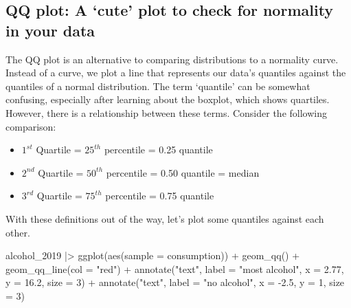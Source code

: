 \documentclass[
  letterpaper,
  DIV=11,
  numbers=noendperiod]{scrreprt}
\newenvironment{Shaded}{\begin{snugshade}}{\end{snugshade}}
\newcommand{\AttributeTok}[1]{\textcolor[rgb]{0.40,0.45,0.13}{#1}}
\newcommand{\DecValTok}[1]{\textcolor[rgb]{0.68,0.00,0.00}{#1}}
\newcommand{\FloatTok}[1]{\textcolor[rgb]{0.68,0.00,0.00}{#1}}
\newcommand{\FunctionTok}[1]{\textcolor[rgb]{0.28,0.35,0.67}{#1}}
\newcommand{\NormalTok}[1]{\textcolor[rgb]{0.00,0.23,0.31}{#1}}
\newcommand{\SpecialCharTok}[1]{\textcolor[rgb]{0.37,0.37,0.37}{#1}}
\newcommand{\StringTok}[1]{\textcolor[rgb]{0.13,0.47,0.30}{#1}}
\begin{document}
\subsection{QQ plot: A `cute' plot to check for normality in your
data}\label{sec-qq-plot}

The QQ plot is an alternative to comparing distributions to a normality
curve. Instead of a curve, we plot a line that represents our data's
quantiles against the quantiles of a normal distribution. The term
`quantile' can be somewhat confusing, especially after learning about
the boxplot, which shows quartiles. However, there is a relationship
between these terms. Consider the following comparison:

\begin{itemize}
\item
  \(1^{st}\) Quartile = \(25^{th}\) percentile = 0.25 quantile
\item
  \(2^{nd}\) Quartile = \(50^{th}\) percentile = 0.50 quantile = median
\item
  \(3^{rd}\) Quartile = \(75^{th}\) percentile = 0.75 quantile
\end{itemize}

With these definitions out of the way, let's plot some quantiles against
each other.

\begin{Shaded}
\begin{Highlighting}[]
\NormalTok{alcohol\_2019 }\SpecialCharTok{|\textgreater{}}
  \FunctionTok{ggplot}\NormalTok{(}\FunctionTok{aes}\NormalTok{(}\AttributeTok{sample =}\NormalTok{ consumption)) }\SpecialCharTok{+}
  \FunctionTok{geom\_qq}\NormalTok{() }\SpecialCharTok{+}
  \FunctionTok{geom\_qq\_line}\NormalTok{(}\AttributeTok{col =} \StringTok{"red"}\NormalTok{) }\SpecialCharTok{+}
  \FunctionTok{annotate}\NormalTok{(}\StringTok{"text"}\NormalTok{,}
           \AttributeTok{label =} \StringTok{"most alcohol"}\NormalTok{,}
           \AttributeTok{x =} \FloatTok{2.77}\NormalTok{,}
           \AttributeTok{y =} \FloatTok{16.2}\NormalTok{,}
           \AttributeTok{size =} \DecValTok{3}\NormalTok{) }\SpecialCharTok{+}
  \FunctionTok{annotate}\NormalTok{(}\StringTok{"text"}\NormalTok{,}
           \AttributeTok{label =} \StringTok{"no alcohol"}\NormalTok{,}
           \AttributeTok{x =} \SpecialCharTok{{-}}\FloatTok{2.5}\NormalTok{,}
           \AttributeTok{y =} \DecValTok{1}\NormalTok{,}
           \AttributeTok{size =} \DecValTok{3}\NormalTok{)}
\end{Highlighting}
\end{Shaded}
\end{document}
